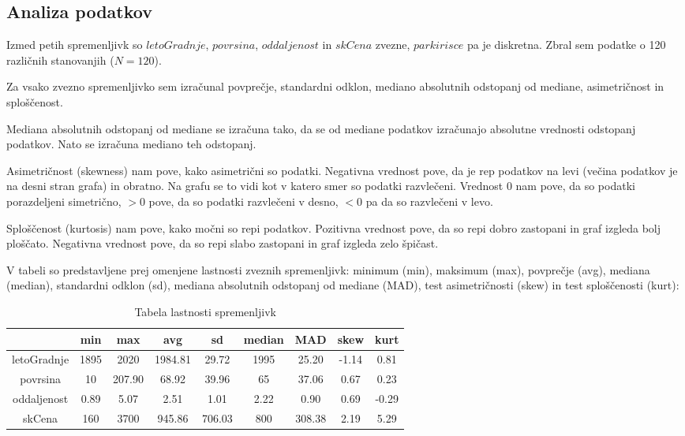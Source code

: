 \documentclass[a4paper, 12pt]{article}
\begin{document}
\subsection{Analiza podatkov}

Izmed petih spremenljivk so $ letoGradnje $, $ povrsina $,
$ oddaljenost $ in $ skCena $ zvezne, $ parkirisce $ pa je
diskretna. Zbral sem podatke o 120 različnih stanovanjih ($ N = 120 $).

Za vsako zvezno spremenljivko sem izračunal povprečje, standardni odklon,
mediano absolutnih odstopanj od mediane, asimetričnost in sploščenost.

Mediana absolutnih odstopanj od mediane se izračuna tako, da se od mediane
podatkov izračunajo absolutne vrednosti odstopanj podatkov. Nato se izračuna
mediano teh odstopanj.

Asimetričnost (skewness) nam pove, kako asimetrični so podatki. Negativna
vrednost pove, da je rep podatkov na levi (večina podatkov je na desni stran
grafa) in obratno. Na grafu se to vidi kot v katero smer so podatki razvlečeni.
Vrednost $ 0 $ nam pove, da so podatki porazdeljeni simetrično, $ >0 $ pove, da
so podatki razvlečeni v desno, $ <0 $ pa da so razvlečeni v levo.

Sploščenost (kurtosis) nam pove, kako močni so repi podatkov. Pozitivna
vrednost pove, da so repi dobro zastopani in graf izgleda bolj ploščato.
Negativna vrednost pove, da so repi slabo zastopani in graf izgleda zelo
špičast.

V tabeli so predstavljene prej omenjene lastnosti zveznih spremenljivk:
minimum (min), maksimum (max), povprečje (avg), mediana (median),
standardni odklon (sd), mediana absolutnih odstopanj od mediane (MAD), test
asimetričnosti (skew) in test sploščenosti (kurt):
\begin{table}[H]
\begin{center}
\begin{tabular}{ c|cccccccc }
	& min & max & avg & sd & median & MAD & skew & kurt \\
	\hline
	letoGradnje & 1895 & 2020 & 1984.81 & 29.72 & 1995 & 25.20 & -1.14 & 0.81 \\
	povrsina & 10 & 207.90 & 68.92 & 39.96 & 65 & 37.06 & 0.67 & 0.23 \\
	oddaljenost & 0.89 & 5.07 & 2.51 & 1.01 & 2.22 & 0.90 & 0.69 & -0.29 \\
	skCena & 160 & 3700 & 945.86 & 706.03 & 800 & 308.38 & 2.19 & 5.29 \\
\end{tabular}
\caption{Tabela lastnosti spremenljivk}
\label{table:2}
\end{center}
\end{table}
\end{document}
